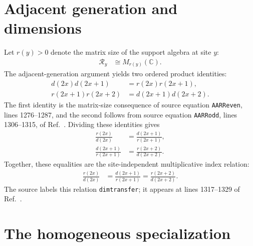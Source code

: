 \documentclass[11pt]{article}
\begin{document}
\section{Adjacent generation and dimensions}

Let $r(y)>0$ denote the matrix size of the support algebra at site $y$:
\begin{align}
    \mathcal R_y
     & \cong M_{r(y)}(\mathbb C).
    \label{eq:gnvw12_site_dependent_adjacent_generation_scope_support_size}
\end{align}
The adjacent-generation argument yields two ordered product identities:
\begin{align}
    d(2x)d(2x+1)
     & =r(2x)r(2x+1),
    \label{eq:gnvw12_site_dependent_adjacent_generation_scope_even_dimension} \\
    r(2x+1)r(2x+2)
     & =d(2x+1)d(2x+2).
    \label{eq:gnvw12_site_dependent_adjacent_generation_scope_odd_dimension}
\end{align}
The first identity is the matrix-size consequence of source equation
\texttt{AARReven}, lines 1276--1287, and the second follows from source
equation \texttt{AARRodd}, lines 1306--1315, of
Ref.~\cite{Gross2012IndexTheory}. Dividing these identities gives
\begin{align}
    \frac{r(2x)}{d(2x)}
     & =\frac{d(2x+1)}{r(2x+1)},
    \label{eq:gnvw12_site_dependent_adjacent_generation_scope_even_odd_ratio} \\
    \frac{d(2x+1)}{r(2x+1)}
     & =\frac{r(2x+2)}{d(2x+2)}.
    \label{eq:gnvw12_site_dependent_adjacent_generation_scope_odd_even_ratio}
\end{align}
Together, these equalities are the site-independent multiplicative index
relation:
\begin{align}
    \frac{r(2x)}{d(2x)}
     & =\frac{d(2x+1)}{r(2x+1)}
    =\frac{r(2x+2)}{d(2x+2)}.
    \label{eq:gnvw12_site_dependent_adjacent_generation_scope_index_ratio}
\end{align}
The source labels this relation \texttt{dimtransfer}; it appears at lines
1317--1329 of Ref.~\cite{Gross2012IndexTheory}.

\section{The homogeneous specialization}
\end{document}

